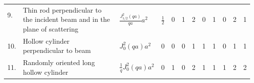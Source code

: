 \begin{table}[htb]
\begin{tabular}{|lL{5.5cm}|l|l|l|l|l|l|l|l|l|l|}
\parbox{0.3cm}{9.\newline\phantom{9.}\newline\phantom{9.}}& Thin rod perpendicular to the incident beam and in the plane of scattering
             & $\displaystyle \frac{J^2_{1/2}(qa)}{qa} a^2$       & $\displaystyle\frac12$ & 0 & 1 & 2 & 0  & 1 & 0 & 2 & 1\\
\parbox{0.3cm}{10.\newline\phantom{10.}}& Hollow cylinder perpendicular to beam
             & $\displaystyle J^2_{0}(qa) a^2$      & 0   & 0  & 0 & 1 & 1 & 1 & 0 & 1 & 1\\
\parbox{0.3cm}{11.\newline\phantom{11.}}& Randomly oriented long hollow cylinder
             & $\displaystyle \frac1qJ^2_{0}(qa) a^2$     & 0  & 1 & 0 & 2 & 1 & 1 & 1 & 2 & 2 \\ \bottomrule
\end{tabular}

\end{table}


